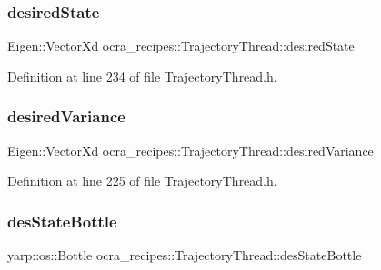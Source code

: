 \hypertarget{classocra__recipes_1_1TrajectoryThread_a2f90808ce72fd5a3a5d0b5d576860564}{}\label{classocra__recipes_1_1TrajectoryThread_a2f90808ce72fd5a3a5d0b5d576860564} 
\subsubsection{\texorpdfstring{desired\+State}{desiredState}}
{\footnotesize\ttfamily Eigen\+::\+Vector\+Xd ocra\+\_\+recipes\+::\+Trajectory\+Thread\+::desired\+State\hspace{0.3cm}{\ttfamily [protected]}}



Definition at line 234 of file Trajectory\+Thread.\+h.

\hypertarget{classocra__recipes_1_1TrajectoryThread_a86a09c83fbbf2b7a22469a3476204b24}{}\label{classocra__recipes_1_1TrajectoryThread_a86a09c83fbbf2b7a22469a3476204b24} 
\subsubsection{\texorpdfstring{desired\+Variance}{desiredVariance}}
{\footnotesize\ttfamily Eigen\+::\+Vector\+Xd ocra\+\_\+recipes\+::\+Trajectory\+Thread\+::desired\+Variance\hspace{0.3cm}{\ttfamily [protected]}}



Definition at line 225 of file Trajectory\+Thread.\+h.

\hypertarget{classocra__recipes_1_1TrajectoryThread_aae66d09e0f64c124428cebcdb53bdf33}{}\label{classocra__recipes_1_1TrajectoryThread_aae66d09e0f64c124428cebcdb53bdf33} 
\subsubsection{\texorpdfstring{des\+State\+Bottle}{desStateBottle}}
{\footnotesize\ttfamily yarp\+::os\+::\+Bottle ocra\+\_\+recipes\+::\+Trajectory\+Thread\+::des\+State\+Bottle\hspace{0.3cm}{\ttfamily [protected]}}



